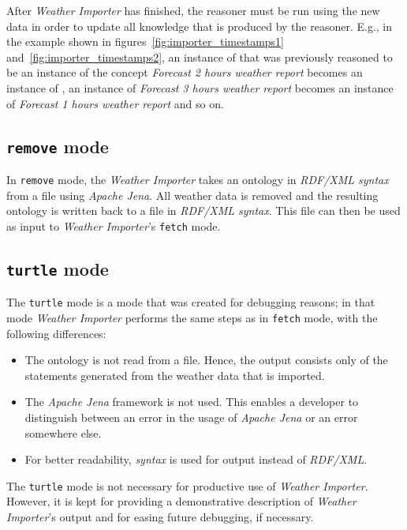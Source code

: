 After \emph{Weather Importer} has finished, the  reasoner must be run using the new data in order to update all knowledge that is produced by the reasoner. E.g., in the example shown in figures~\ref{fig:importer_timestamps1} and~\ref{fig:importer_timestamps2}, an instance of  that was previously reasoned to be an instance of the concept \emph{Forecast 2 hours weather report} becomes an instance of , an instance of \emph{Forecast 3 hours weather report} becomes an instance of \emph{Forecast 1 hours weather report} and so on.

\subsection{\texttt{remove} mode}

In \texttt{remove} mode, the \emph{Weather Importer} takes an ontology in \emph{RDF/XML syntax} from a file using \emph{Apache Jena}. All weather data is removed and the resulting ontology is written back to a file in \emph{RDF/XML syntax}. This file can then be used as input to \emph{Weather Importer}'s \texttt{fetch} mode.

\subsection{\texttt{turtle} mode}
\label{subsec:importer_turtle}

The \texttt{turtle} mode is a mode that was created for debugging reasons; in that mode \emph{Weather Importer} performs the same steps as in \texttt{fetch} mode, with the following differences:
\begin{itemize}
  \item The \smarthomeweather ontology is not read from a file. Hence, the output consists only of the statements generated from the weather data that is imported.
  \item The \emph{Apache Jena} framework is not used. This enables a developer to distinguish between an error in the usage of \emph{Apache Jena} or an error somewhere else.
  \item For better readability, \emph{ syntax} is used for output instead of \emph{RDF/XML}.
\end{itemize}

The \texttt{turtle} mode is not necessary for productive use of \emph{Weather Importer}. However, it is kept for providing a demonstrative description of \emph{Weather Importer}'s output and for easing future debugging, if necessary.

